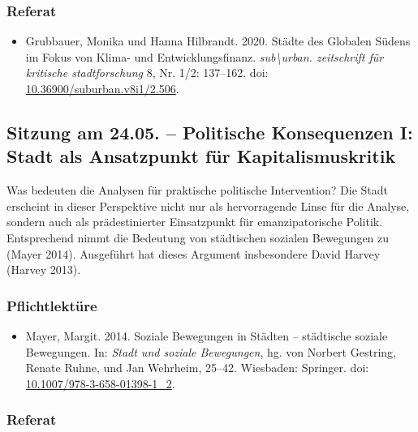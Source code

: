 \documentclass[
  ngerman,
]{article}
\providecommand{\tightlist}{%
  \setlength{\itemsep}{0pt}\setlength{\parskip}{0pt}}
\begin{document}
\hypertarget{referat-3}{%
\subsubsection*{Referat}\label{referat-3}}

\begin{itemize}
\tightlist
\item
  Grubbauer, Monika und Hanna Hilbrandt. 2020. Städte des Globalen Südens im Fokus von Klima- und Entwicklungsfinanz. \emph{sub\textbackslash urban. zeitschrift für kritische stadtforschung} 8, Nr. 1/2: 137--162. doi: \href{https://doi.org/10.36900/suburban.v8i1/2.506}{10.36900/suburban.v8i1/2.506}.
\end{itemize}

\hypertarget{sitzung-am-24.05.-politische-konsequenzen-i-stadt-als-ansatzpunkt-fuxfcr-kapitalismuskritik}{%
\subsection{Sitzung am 24.05. -- Politische Konsequenzen I: Stadt als Ansatzpunkt für Kapitalismuskritik}\label{sitzung-am-24.05.-politische-konsequenzen-i-stadt-als-ansatzpunkt-fuxfcr-kapitalismuskritik}}

Was bedeuten die Analysen für praktische politische Intervention? Die Stadt erscheint in dieser Perspektive nicht nur als hervorragende Linse für die Analyse, sondern auch als prädestinierter Einsatzpunkt für emanzipatorische Politik. Entsprechend nimmt die Bedeutung von städtischen sozialen Bewegungen zu (Mayer 2014). Ausgeführt hat dieses Argument insbesondere David Harvey (Harvey 2013).

\hypertarget{pflichtlektuxfcre-4}{%
\subsubsection*{Pflichtlektüre}\label{pflichtlektuxfcre-4}}

\begin{itemize}
\tightlist
\item
  Mayer, Margit. 2014. Soziale Bewegungen in Städten -- städtische soziale Bewegungen. In: \emph{Stadt und soziale Bewegungen}, hg. von Norbert Gestring, Renate Ruhne, und Jan Wehrheim, 25--42. Wiesbaden: Springer. doi: \href{https://doi.org/10.1007/978-3-658-01398-1_2}{10.1007/978-3-658-01398-1\_2}.
\end{itemize}

\hypertarget{referat-4}{%
\subsubsection*{Referat}\label{referat-4}}
\end{document}
